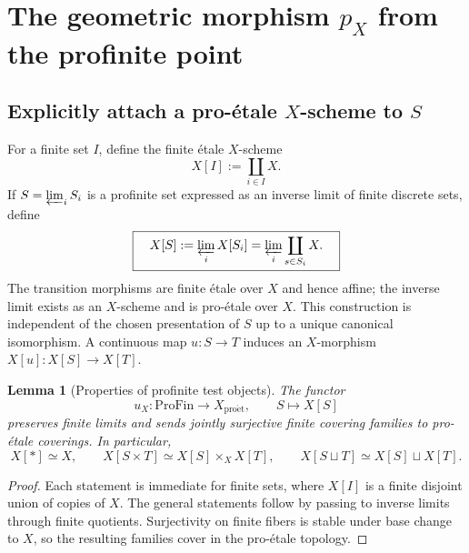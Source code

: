 \documentclass[11pt,a4paper]{article}
\numberwithin{equation}{section}
\newtheorem{lemma}[theorem]{Lemma}
\theoremstyle{definition}
\theoremstyle{remark}
\newcommand{\ProFin}{\mathrm{ProFin}}
\newcommand{\proet}{\mathrm{pro\acute{e}t}}
\begin{document}
\section{\texorpdfstring{The geometric morphism $p_X$ from the profinite point}{The geometric morphism pX from the profinite point}}

\subsection{\texorpdfstring{Explicitly attach a pro-\'{e}tale $X$-scheme to $S$}{Explicitly attach a pro-etale X-scheme to S}}

For a finite set $I$, define the finite \'{e}tale $X$-scheme
\begin{equation}\label{eq:finite-XI}
          X[I]:=\coprod_{i\in I} X.
\end{equation}
If $S=\varprojlim_i S_i$ is a profinite set expressed as an inverse
limit of finite discrete sets, define
\begin{equation}\label{eq:XS}
   \boxed{\quad X[S]:=\varprojlim_i X[S_i]
             =\varprojlim_i\coprod_{s\in S_i}X.\quad}
\end{equation}
The transition morphisms are finite \'{e}tale over $X$ and hence affine;
the inverse limit exists as an $X$-scheme and is pro-\'{e}tale over $X$.
This construction is independent of the chosen presentation of $S$ up
to a unique canonical isomorphism.  A continuous map $u:S\to T$ induces
an $X$-morphism $X[u]:X[S]\to X[T]$.

\begin{lemma}[Properties of profinite test objects]\label{lem:XS}
The functor
\begin{equation}\label{eq:site-functor}
             u_X:\ProFin\longrightarrow X_{\proet},
                      \qquad S\longmapsto X[S]
\end{equation}
preserves finite limits and sends jointly surjective finite covering
families to pro-\'{e}tale coverings.  In particular,
\[
 X[*]\simeq X,\qquad
 X[S\times T]\simeq X[S]\times_X X[T],\qquad
 X[S\sqcup T]\simeq X[S]\sqcup X[T].
\]
\end{lemma}
\begin{proof}
Each statement is immediate for finite sets, where $X[I]$ is a finite
disjoint union of copies of $X$.  The general statements follow by
passing to inverse limits through finite quotients.  Surjectivity on
finite fibers is stable under base change to $X$, so the resulting
families cover in the pro-\'{e}tale topology.
\end{proof}
\end{document}
